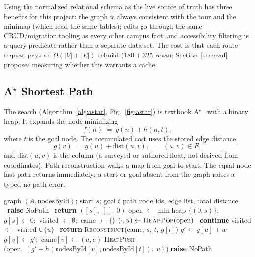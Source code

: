 Using the normalized relational schema as the live source of truth has
three benefits for this project: the graph is always consistent with the
tour and the minimap (which read the same tables); edits go through the
same CRUD/migration tooling as every other campus fact; and accessibility
filtering is a query predicate rather than a separate data set. The cost is
that each route request pays an $O(|V| + |E|)$ rebuild ($180 + 325$ rows);
Section~\ref{sec:eval} proposes measuring whether this warrants a cache.

\subsection{A$^{\star}$ Shortest Path}
The search (Algorithm~\ref{alg:astar}, Fig.~\ref{fig:astar}) is textbook
A$^{\star}$~\cite{hart1968astar,russell2020aima} with a binary heap. It
expands the node minimizing
\begin{equation}
f(n) \;=\; g(n) + h(n, t),
\label{eq:fn}
\end{equation}
where $t$ is the goal node. The accumulated cost uses the stored edge
distance,
\begin{equation}
g(v) \;=\; g(u) + \mathrm{dist}(u,v), \qquad (u,v) \in E,
\label{eq:gn}
\end{equation}
and $\mathrm{dist}(u,v)$ is the  column (a surveyed or
authored float, not derived from coordinates). Path reconstruction walks a
 map from goal to start. The equal-node fast path returns
immediately; a start or goal absent from the graph raises a typed
no-path error.

\begin{algorithm}[!t]
\caption{A$^{\star}$ Campus Pathfinding}
\label{alg:astar}
\begin{algorithmic}[1]
\Require graph $(A, \text{nodesById})$; start $s$; goal $t$
\Ensure path node ids, edge list, total distance
\ \textbf{raise} NoPath \EndIf
{}\ \textbf{return} $([s],\ [\,],\ 0)$ \EndIf
\State open $\gets$ min-heap $\{(0, s)\}$;\ $g[s] \gets 0$;\ visited $\gets \emptyset$;\ came $\gets \{\}$
  \State $(\cdot,u) \gets \textsc{HeapPop}(\text{open})$
  \ \textbf{continue} \EndIf
  \State visited $\gets$ visited $\cup \{u\}$
  \ \textbf{return} \textsc{Reconstruct}(came, $s$, $t$, $g[t]$) \EndIf
    \State $g' \gets g[u] + w$
       \State $g[v] \gets g'$;\ came$[v] \gets (u, e)$
       \State \textsc{HeapPush}$\big(\text{open},\ (g' + h(\text{nodesById}[v], \text{nodesById}[t]),\ v)\big)$
    \EndIf
  \EndFor
\EndWhile
\State \textbf{raise} NoPath
\end{algorithmic}
\end{algorithm}

